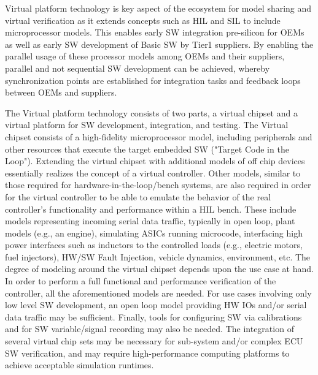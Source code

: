 Virtual platform technology is key aspect of the ecosystem for model sharing and virtual verification as it extends concepts such as HIL and SIL to include microprocessor models. This enables early SW integration pre-silicon for OEMs as well as early SW development of Basic SW by Tier1 suppliers. By enabling the parallel usage of these processor models among OEMs and their suppliers, parallel and not sequential SW development can be achieved, whereby synchronization points are established for integration tasks and feedback loops between OEMs and suppliers.

The Virtual platform technology consists of two parts, a virtual chipset and a virtual platform for SW development, integration, and testing.
The Virtual chipset consists of a high-fidelity microprocessor model, including peripherals and other resources that execute the target embedded SW ("Target Code in the Loop").
Extending the virtual chipset with additional models of off chip devices essentially realizes the concept of a virtual controller.
Other models, similar to those required for hardware-in-the-loop/bench systems, are also required in order for the virtual controller to be able to emulate the behavior of the real controller's functionality and performance within a HIL bench.
These include models representing incoming serial data traffic, typically in open loop,
plant models (e.g., an engine), simulating ASICs running microcode, interfacing high power interfaces such as inductors to the controlled loads (e.g., electric motors, fuel injectors), HW/SW Fault Injection, vehicle dynamics, environment, etc.
The degree of modeling around the virtual chipset depends upon the use case at hand.
In order to perform a full functional and performance verification of the controller, all the aforementioned models are needed.
For use cases involving only low level SW development, an open loop model providing HW IOs and/or serial data traffic may be sufficient.
Finally, tools for configuring SW via calibrations and for SW variable/signal recording may also be needed. The integration of several virtual chip sets may be necessary for sub-system and/or complex ECU SW verification, and may require high-performance computing platforms to achieve acceptable simulation runtimes.
